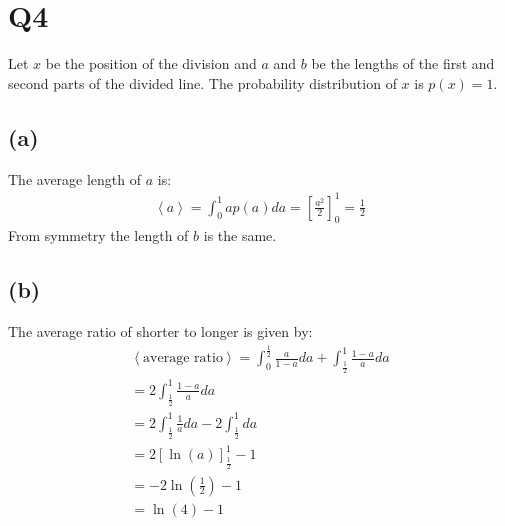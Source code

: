 \documentclass[../main.tex]{subfiles}
\begin{document}
\section*{Q4}
Let $x$ be the position of the division and $a$ and $b$ be the lengths of the first and second parts of the divided line. The probability distribution of $x$ is $p(x)=1$.
\subsection*{(a)}
The average length of $a$ is:
\begin{align*}
	\left<a\right> = \int_0^1a p(a)da = \left[\frac{a^2}{2}\right]^1_0 = \frac{1}{2}
\end{align*}
From symmetry the length of $b$ is the same.
\subsection*{(b)}
The average ratio of shorter to longer is given by:
\begin{align*}
	\left<\text{average ratio}\right> = \int_0^{\frac{1}{2}} \frac{a}{1-a}da + \int_{\frac{1}{2}}^1\frac{1-a}{a}da\\
	=2\int_{\frac{1}{2}}^1\frac{1-a}{a}da\\
	=2\int_{\frac{1}{2}}^1\frac{1}{a}da - 2\int_{\frac{1}{2}}^1da \\
	=2\left[\ln\left(a\right)\right]_{\frac{1}{2}}^1 - 1 \\
	=-2\ln\left(\frac{1}{2}\right)-1\\
	=\ln(4)-1
\end{align*}
\end{document}
